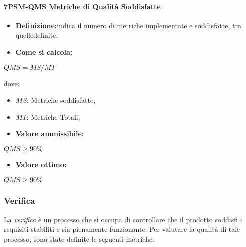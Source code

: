 \paragraph*{7PSM-QMS Metriche di Qualità Soddisfatte}
\begin{itemize}
    \item \textbf{Definizione:}indica il numero di metriche implementate e soddisfatte, tra quelledefinite.
    \item \textbf{Come si calcola:}
\end{itemize}
\begin{center}
    $QMS = MS/MT$ 
 \end{center}
 dove:
 \begin{itemize}[label=$\rightarrow$]
     \item $MS$: Metriche soddisfatte;
     \item $MT$: Metriche Totali;
 \end{itemize}
\begin{itemize}
    \item \textbf{Valore ammissibile:}
\end{itemize}
\begin{center}
    $QMS \geq 90\%$
\end{center}
\begin{itemize}
    \item \textbf{Valore ottimo:}
\end{itemize}
\begin{center}
    $QMS \geq 90\%$
\end{center}

\subsubsection{Verifica}
La \emph{verifica} è un processo che si occupa di controllare che il prodotto soddisfi i requisiti
stabiliti e sia pienamente funzionante. Per valutare la qualità di tale processo, sono state
definite le seguenti metriche.


